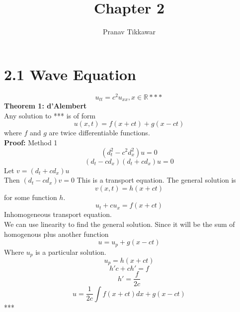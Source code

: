\documentclass{article}
\author{Pranav Tikkawar}
\title{Chapter 2 }
\begin{document}
\maketitle
\section*{2.1 Wave Equation}
$$ u_{tt} = c^2 u_{xx}, x \in \mathds{R} ***$$
\textbf{Theorem 1: d'Alembert}\\
Any solution to *** is of form $$ u(x,t) = f(x + ct) + g(x - ct) $$  where $f$ and $g$ are twice differentiable functions.\\
\textbf{Proof:} Method 1\\
$$ (d_t^2 - c^2 d_x^2 )u  = 0 $$
$$ (d_t - c d_x)(d_t + c d_x)u = 0 $$
Let $ v = (d_t + c d_x)u $\\
Then $ (d_t - c d_x)v = 0 $
This is a transport equation. The general solution is $$ v(x,t) = h(x + ct) $$ for some function $h$.\\
$$ u_t + c u_x  = f(x + ct) $$
Inhomogeneous transport equation.\\
We can use linearity to find the general solution. Since it will be the sum of homogenous plus another function\\
$$ u = u_p + g(x-ct) $$
Where $u_p$ is a particular solution.\\
$$ u_p = h(x + ct) $$
$$h'c + ch' =  f$$ 
$$h' = \frac{f}{2c}$$
$$ u = \frac{1}{2c} \int f(x + ct) dx + g(x - ct)$$***
\end{document}
